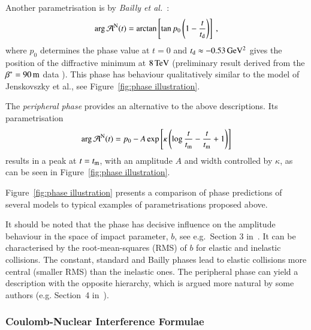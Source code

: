 Another parametrisation is by {\em Bailly et al.}~\cite{bailly87}:
\begin{equation}
\label{eq:nuc phase bai}
	\arg {\cal A}^{\rm N}(t) = \arctan \left[ \tan p_0 \left(1 - {t\over t_{\rm d}} \right) \right]\ ,
\end{equation}
where $p_0$ determines the phase value at $t=0$ and $t_{\rm d} \approx -0.53\,{\rm GeV^2}$ gives the position of the diffractive minimum at $8\,{\rm TeV}$ (preliminary result derived from the $\beta^* = 90\,{\rm m}$ data \cite{8tev-90m}). This phase has behaviour qualitatively similar to the model of Jenskovszky et al., see Figure~\ref{fig:phase illustration}.

The {\it peripheral phase} \cite{kl94} provides an alternative to the above descriptions. Its parametrisation
\begin{equation}
\label{eq:nuc phase per}
\arg {\cal A}^{\rm N}(t) = p_0 - A \exp\left[ \kappa \left( \log {t\over t_{\rm m}} - {t\over t_{\rm m}} + 1 \right) \right]
\end{equation}
results in a peak at $t = t_{\rm m}$, with an amplitude $A$ and width controlled by $\kappa$, as can be seen in Figure~\ref{fig:phase illustration}.

Figure~\ref{fig:phase illustration} presents a comparison of phase predictions of several models to typical examples of parametrisations proposed above.

It should be noted that the phase has decisive influence on the amplitude behaviour in the space of impact parameter, $b$, see e.g.~Section 3 in~\cite{klk02}. It can be characterised by the root-mean-squares (RMS) of $b$ for elastic and inelastic collisions. The constant, standard and Bailly phases lead to elastic collisions more central (smaller RMS) than the inelastic ones. The peripheral phase can yield a description with the opposite hierarchy, which is argued more natural by some authors (e.g. Section~4 in~\cite{kl96}).

\subsubsection{Coulomb-Nuclear Interference Formulae}
\label{sec:cni interference}

